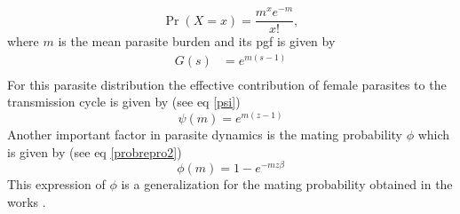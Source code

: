 \documentclass[12pt,a4paper]{article}
\theoremstyle{plain}%
\theoremstyle{definition}
\theoremstyle{remark}
\begin{document}
	\begin{equation}
	\Pr(X=x)=\frac {m^{x}e^{-m}}{x!},
	\end{equation}     
	where $m$ is the mean parasite burden and its pgf is given by
	\begin{equation}
	\begin{split}
	G(s)&=e^{m(s-1)}\\
	\end{split}
	\end{equation}
	For this parasite distribution %
	the effective contribution of female parasites to the transmission cycle is given by (see eq \eqref{psi})
	\begin{equation}
	\psi(m)=e^{m(z-1)}
	\end{equation}
	Another important factor in parasite dynamics is the mating probability $\phi$ which is given by (see eq \ref{probrepro2})
	\begin{equation}
	\phi(m)=
	1-e^{-mz \beta}
	\end{equation}
	This expression of $\phi$ is a generalization for the  mating probability obtained in the works \cite{anderson1992infectious,may1993biased,may1977togetherness}. 
	
	
	
\end{document}
